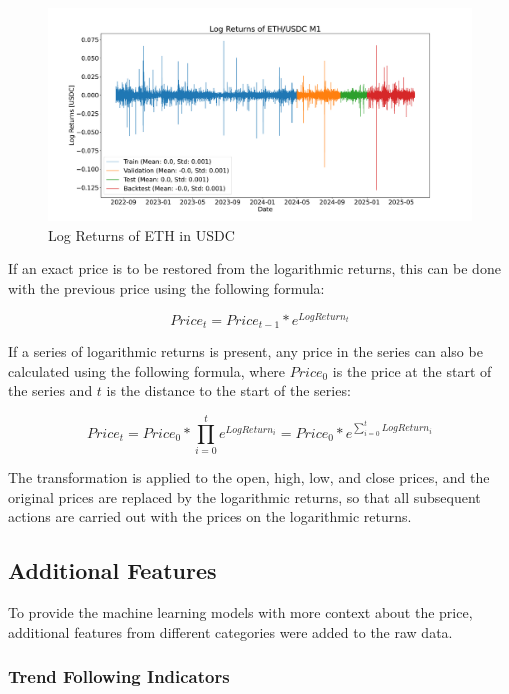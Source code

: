 \begin{figure}[H]
    \centering
    \includegraphics[width=\textwidth]{images/eda/log_returns_ethusdc}
    \caption{Log Returns of ETH in USDC}
    \label{fig:eth-log-data}
\end{figure}

\noindent
If an exact price is to be restored from the logarithmic returns, this can be done with the previous price using the following formula:

\[
    Price_t = Price_{t-1} * e^{LogReturn_t}
\]

\noindent
If a series of logarithmic returns is present, any price in the series can also be calculated using the following formula, where $Price_{0}$ is the price at the start of the series and $t$ is the distance to the start of the series:

\[
    Price_t = Price_0 * \prod_{i=0}^{t} e^{LogReturn_{i}} = Price_0 * e^{\sum_{i=0}^{t} LogReturn_i}
\]

\noindent
The transformation is applied to the open, high, low, and close prices, and the original prices are replaced by the logarithmic returns, so that all subsequent actions are carried out with the prices on the logarithmic returns.

\subsection{Additional Features}
\label{chap:additional-features}

To provide the machine learning models with more context about the price, additional features from different categories were added to the raw data.

\subsubsection{Trend Following Indicators}

